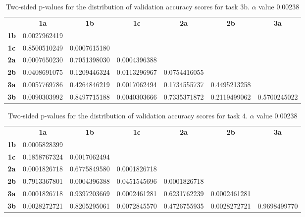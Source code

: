 \begin{table}[h!]
    \centering
    \begin{tabular}{ccccccc}
                & \textbf{1a}        & \textbf{1b}        & \textbf{1c}        & \textbf{2a}  & \textbf{2b}  & \textbf{3a}  \\
    \textbf{1b} & 0.0027962419       &                    &                    &              &              &              \\
    \textbf{1c} & 0.8500510249       & 0.0007615180       &                    &              &              &              \\
    \textbf{2a} & 0.0007650230       & 0.7051398030       & 0.0004396388       &              &              &              \\
    \textbf{2b} & 0.0408691075       & 0.1209446324       & 0.0113296967       & 0.0754416055 &              &              \\
    \textbf{3a} & 0.0057769786       & 0.4264846219       & 0.0017062494       & 0.1734555737 & 0.4495213258 &              \\
    \textbf{3b} & 0.0090303992       & 0.8497715188       & 0.0040303666       & 0.7335371872 & 0.2119499062 & 0.5700245022
    \end{tabular}
    \caption[p-table for validation accuracy (task 3b)]{Two-sided p-values for the distribution of validation accuracy scores for task 3b. \(\alpha\) value 0.00238}
    \label{tab:exp2.validation3b}
\end{table}

\begin{table}[h!]
    \centering
    \begin{tabular}{ccccccc}
                & \textbf{1a}        & \textbf{1b}        & \textbf{1c}        & \textbf{2a}        & \textbf{2b}        & \textbf{3a}  \\
    \textbf{1b} & 0.0005828399       &                    &                    &                    &                    &              \\
    \textbf{1c} & 0.1858767324       & 0.0017062494       &                    &                    &                    &              \\
    \textbf{2a} & 0.0001826718       & 0.6775849580       & 0.0001826718       &                    &                    &              \\
    \textbf{2b} & 0.7913367801       & 0.0004396388       & 0.0451545696       & 0.0001826718       &                    &              \\
    \textbf{3a} & 0.0001826718       & 0.9397203669       & 0.0002461281       & 0.6231762239       & 0.0002461281       &              \\
    \textbf{3b} & 0.0028272721       & 0.8205295061       & 0.0072845570       & 0.4726755935       & 0.0028272721       & 0.9698499770
    \end{tabular}
    \caption[p-table for validation accuracy (task 4)]{Two-sided p-values for the distribution of validation accuracy scores for task 4. \(\alpha\) value 0.00238}
    \label{tab:exp2.validation4}
\end{table}

\newpage
